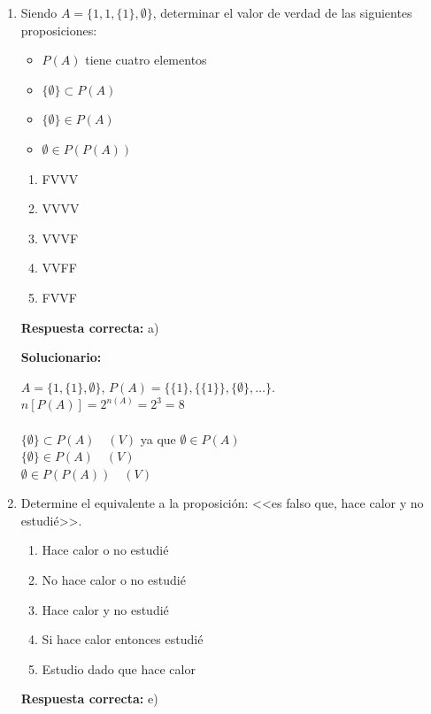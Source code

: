 \begin{enumerate}
	
	
	
	\item Siendo $A = \{ 1, 1, \{1\}, \emptyset \}$, determinar el valor de verdad de las siguientes proposiciones:
	\begin{itemize}
		\item[I.] $P(A)$ tiene cuatro elementos
		\item[II.] $\{\emptyset\} \subset P(A)$
		\item[III.] $\{\emptyset\} \in P(A)$
		\item[IV.] $\emptyset \in P(P(A))$
	\end{itemize}
	\begin{enumerate}[label=\alph*)]
		\item FVVV
		\item VVVV
		\item VVVF
		\item VVFF
		\item FVVF
	\end{enumerate}
	\textbf{Respuesta correcta:} a) 
	
	\vspace{2mm}
	\textbf{Solucionario:}
	
	$A = \{1, \{1\}, \emptyset\}$, $P(A) = \{\{1\}, \{\{1\}\}, \{\emptyset\}, \dots \}$.\\
	$n[P(A)] = 2^{n(A)} = 2^3 = 8$\\
	\\
	$\{\emptyset\} \subset P(A) \quad (V)$ ya que $\emptyset \in P(A)$\\
	$\{\emptyset\} \in P(A) \quad (V)$\\
	$ \emptyset \in P(P(A)) \quad (V)$
	
	\vspace{5mm}
	
	\item Determine el equivalente a la proposición: <<es falso que, hace calor y no estudié>>.
	\begin{enumerate}[label=\alph*)]
		\item Hace calor o no estudié
		\item No hace calor o no estudié
		\item Hace calor y no estudié
		\item Si hace calor entonces estudié
		\item Estudio dado que hace calor
	\end{enumerate}
	\textbf{Respuesta correcta:} e)
	

\end{enumerate}
